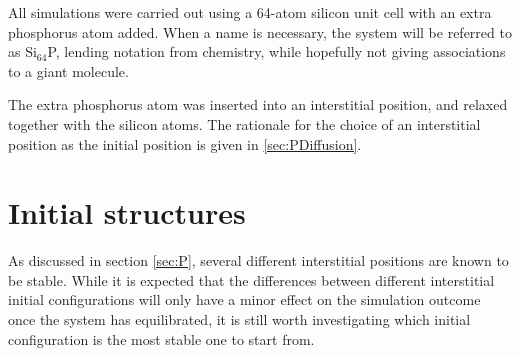 \documentclass[11pt,bibliography=totoc,index=totoc]{scrbook}   %
\begin{document}
All simulations were carried out using a 64-atom silicon unit cell with an extra phosphorus atom added. 
When a name is necessary, the system will be referred to as Si$_{64}$P, lending notation from chemistry, while hopefully not giving associations to a giant molecule.

The extra phosphorus atom was inserted into an interstitial position, and relaxed together with the silicon atoms.
The rationale for the choice of an interstitial position as the initial position is given in \ref{sec:PDiffusion}.



%
\section{Initial structures}\label{sec:structures}
%

As discussed in section \ref{sec:P}, several different interstitial positions are known to be stable.
While it is expected that the differences between different interstitial initial configurations
will only have a minor effect on the simulation outcome once the system has equilibrated,
it is still worth investigating which initial configuration is the most stable one to start from.

\end{document}
